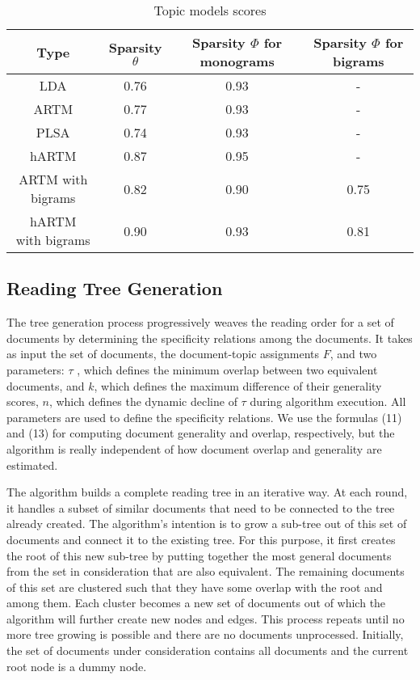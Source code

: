 \documentclass[12pt,twoside]{article}
\begin{document}
	\begin{table}[H] 
	\begin{center}
    \begin{tabular}{|c|c|c|c|}
    \hline
    Type & Sparsity $\theta$ & \specialcell{Sparsity $\Phi$ \\ for monograms} & \specialcell{Sparsity $\Phi$ \\ for bigrams}\\
    \hline
    LDA & 0.76 & 0.93 & -\\
    ARTM & 0.77 & 0.93 & -\\
    PLSA & 0.74 & 0.93 & - \\
    hARTM & 0.87 & 0.95 & - \\
    ARTM with bigrams & 0.82 & 0.90 & 0.75 \\
    \specialcell{hARTM \\ with bigrams} & 0.90 & 0.93 & 0.81\\
    \hline
    \end{tabular}
    \caption{\label{tab:canonsummary}Topic models scores}
    \end{center}
    \end{table} 
	
	\subsection{Reading Tree Generation}
	The tree generation process progressively weaves the reading order for a set of documents by determining the specificity relations among the documents. It takes as input the set of documents, the document-topic assignments $F$, and two parameters: $\tau$ , which defines the minimum overlap between two equivalent documents, and $k$, which defines the maximum difference of their generality scores, $n$, which defines the dynamic decline of $\tau$ during algorithm execution. All parameters are used to define the specificity relations. We use the formulas (11) and (13) for computing document generality and overlap, respectively, but the algorithm is really independent of how document overlap and generality are estimated.
	
	The algorithm builds a complete reading tree in an iterative way\cite{conf/icde/KoutrikaLS15}. At each round, it handles a subset of similar documents that need to be connected to the tree already created. The algorithm’s intention is to grow a sub-tree out of this set of documents and connect it to the existing tree. For this purpose, it first creates the root of this new sub-tree by putting together the most general documents from the set in consideration that are also equivalent. The remaining documents of this set are clustered such that they have some overlap with the root and among them. Each cluster becomes a new set of documents out of which the algorithm will further create new nodes and edges. This process repeats until no more tree growing is possible and there are no documents unprocessed. Initially, the set of documents under consideration contains all documents and the current root node is a dummy node.
	
\end{document}
